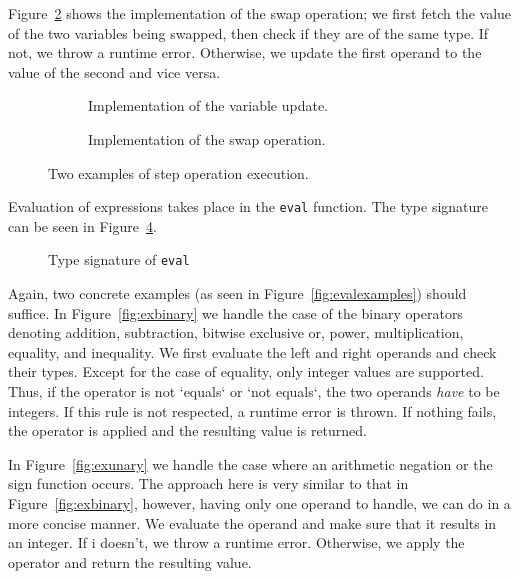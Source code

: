 Figure~\ref{fig:exswap} shows the implementation of the swap operation; we first fetch the value of the two variables being swapped, then check if they are of the same type. If not, we throw a runtime error. Otherwise, we update the first operand to the value of the second and vice versa.

\begin{figure}[h]

  \begin{subfigure}{\textwidth}
    
    \caption{Implementation of the variable update.}\label{fig:exupdate}
  \end{subfigure}

  \begin{subfigure}{\textwidth}
    
    \caption{Implementation of the swap operation.}\label{fig:exswap}
  \end{subfigure}

  \caption{Two examples of step operation execution.}\label{fig:examples}

\end{figure}

\noindent Evaluation of expressions takes place in the \texttt{eval} function. The type signature can be seen in Figure~\ref{fig:eval}.

\begin{figure}[H]
  
  \caption{Type signature of \texttt{eval}}\label{fig:eval}
\end{figure}

\noindent Again, two concrete examples (as seen in Figure~\ref{fig:evalexamples}) should suffice. In Figure~\ref{fig:exbinary} we handle the case of the binary operators denoting addition, subtraction, bitwise exclusive or, power, multiplication, equality, and inequality. We first evaluate the left and right operands and check their types. Except for the case of equality, only integer values are supported. Thus, if the operator is not `equals` or `not equals`, the two operands \textit{have} to be integers. If this rule is not respected, a runtime error is thrown. If nothing fails, the operator is applied and the resulting value is returned.

  In Figure~\ref{fig:exunary} we handle the case where an arithmetic negation or the sign function occurs. The approach here is very similar to that in Figure~\ref{fig:exbinary}, however, having only one operand to handle, we can do in a more concise manner. We evaluate the operand and make sure that it results in an integer. If i doesn't, we throw a runtime error. Otherwise, we apply the operator and return the resulting value.

